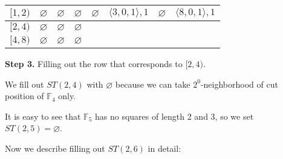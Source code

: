 \documentclass[11pt]{article}
\begin{document}
\begin{appendix}
{\begin{tabular}{|c|c|c|c|c|c|c|c|}
 $[1, 2)$ & $\varnothing$ & $\varnothing$ & $\varnothing$ & $\varnothing$ & $\langle3, 0, 1\rangle, 1$ & $\varnothing$ & $\langle8, 0, 1\rangle, 1$\\ \hline

 $[2, 4)$ & $\varnothing$ & $\varnothing$ & $\varnothing$ & & & & \\ \hline

 $[4, 8)$ & $\varnothing$ & $\varnothing$ & $\varnothing$ & & & & \\ \hline
\end{tabular}
}

{\bf Step 3.} Filling out the row that corresponds to $[2,4)$.

\begin{itemize}
\begin{item}
We fill out $ST(2, 4)$ with $\varnothing$ because we can take $2^0$-neighborhood of cut position of $\mathbb{F}_4$
only.
\end{item}
\begin{item}
It is easy to see that $\mathbb{F}_5$ has no squares of length 2 and 3, so we set $ST(2, 5) = \varnothing$.
\end{item}
\begin{item}
Now we describe filling out $ST(2, 6)$ in detail:


\end{item}
\end{itemize}
\end{appendix}
\end{document}
